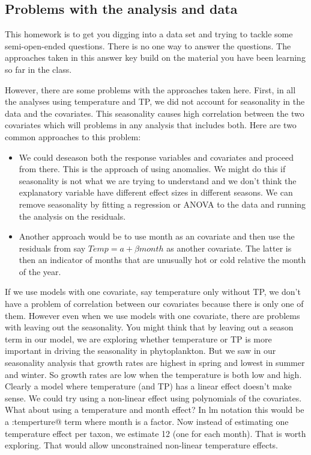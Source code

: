 \subsection*{Problems with the analysis and data}

This homework is to get you digging into a data set and trying to tackle some semi-open-ended questions.  There is no one way to answer the questions.  The approaches taken in this answer key build on the material you have been learning so far in the class.

However, there are some problems with the approaches taken here.  First, in all the analyses using temperature and TP, we did not account for seasonality in the data and the covariates.  This seasonality causes high correlation between the two covariates which will problems in any analysis that includes both.  
Here are two common approaches to this problem:
\begin{itemize}
\item We could deseason both the response variables and covariates and proceed from there.  This is the approach of using anomalies. We might do this if seasonality is not what we are trying to understand and we don't think the explanatory variable have different effect sizes in different seasons.  We can remove seasonality by fitting a regression or ANOVA to the data and running the analysis on the residuals.
\item Another approach would be to use month as an covariate and then use the residuals from say $Temp = a + \beta month$ as another covariate.  The latter is then an indicator of months that are unusually hot or cold relative the month of the year.
\end{itemize}


If we use models with one covariate, say temperature only without TP, we don't have a problem of correlation between our covariates because there is only one of them.  However even when we use models with one covariate, there are  problems with leaving out the seasonality.  You might think that by leaving out a season term in our model, we are exploring whether temperature or TP is more important in driving the seasonality in phytoplankton.  But we saw in our seasonality analysis that growth rates are highest in spring and lowest in summer and winter.  So growth rates are low when the temperature is both low and high.  Clearly a model where temperature (and TP) has a linear effect doesn't make sense.  We could try using a non-linear effect using polynomials of the covariates.  What about using a temperature and month effect?  In lm notation this would be a \verb@month:temperture@ term where month is a factor.  Now instead of estimating one temperature effect per taxon, we estimate 12 (one for each month).  That is worth exploring.  That would allow unconstrained non-linear temperature effects.


